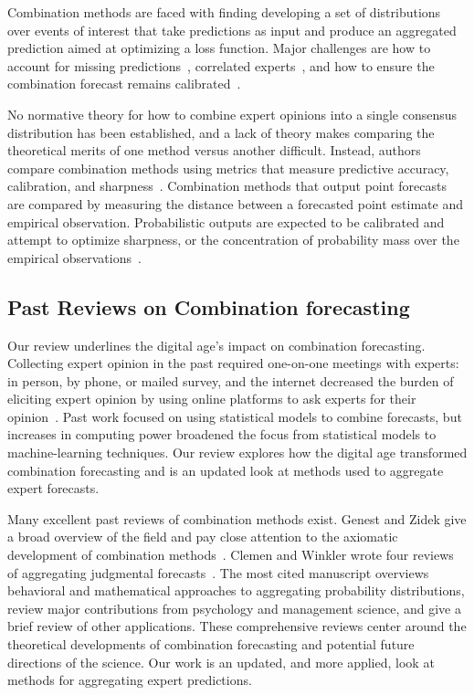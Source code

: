 \documentclass[preprint]{elsarticle}
\begin{document}
Combination methods are faced with finding developing a set of distributions over events of interest that take predictions as input and produce an aggregated prediction aimed at optimizing a loss function. 
Major challenges are how to account for missing predictions~\cite{capistran2009forecast}, correlated experts~\cite{armstrong1985long,bunn1985statistical,bunn1979synthesis}, and how to ensure the combination forecast remains calibrated~\cite{ranjan2010combining,gneiting2013combining,berrocal2007combining,glahn2009mos,kleiber2011locally,garratt2019empirically}.

No normative theory for how to combine expert opinions into a single consensus distribution has been established, and a lack of theory makes comparing the theoretical merits of one method versus another difficult. 
Instead, authors compare combination methods using metrics that measure predictive accuracy, calibration, and sharpness~\cite{jolliffe2012forecast,gneiting2007strictly,gneiting2011comparing,dawid2007geometry,hora2015calibration}.
Combination methods that output point forecasts are compared by measuring the distance between a forecasted point estimate and empirical observation.
Probabilistic outputs are expected to be calibrated and attempt to optimize sharpness, or the concentration of probability mass over the empirical observations~\cite{gneiting2007strictly,gneiting2011comparing,hora2015calibration,jolliffe2012forecast}.

\subsection{Past Reviews on Combination forecasting}

Our review underlines the digital age's impact on combination forecasting.
Collecting expert opinion in the past required one-on-one meetings with experts: in person, by phone, or mailed survey, and the internet decreased the burden of eliciting expert opinion by using online platforms to ask experts for their opinion~\cite{howe2006rise}.
Past work focused on using statistical models to combine forecasts, but increases in computing power broadened the focus from statistical models to machine-learning techniques.
Our review explores how the digital age transformed combination forecasting and is an updated look at methods used to aggregate expert forecasts. 

Many excellent past reviews of combination methods exist.
Genest and Zidek give a broad overview of the field and pay close attention to the axiomatic development of combination methods~\cite{genest1986combining}.
Clemen and Winkler wrote four reviews of aggregating judgmental forecasts~\cite{clemen1986combining, clemen1989combining, clemen1999combining,ISI:000081846900004}.
The most cited manuscript overviews behavioral and mathematical approaches to aggregating probability distributions, review major contributions from psychology and management science, and give a brief review of other applications.
These comprehensive reviews center around the theoretical developments of combination forecasting and potential future directions of the science.
Our work is an updated, and more applied, look at methods for aggregating expert predictions.
\end{document}

